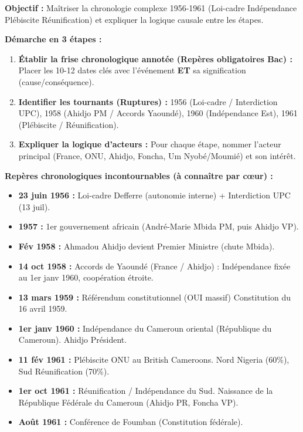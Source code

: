 \documentclass[11pt]{article}
\newcommand{\cle}[1]{{\popxbold\color{popdark}#1}}
\begin{document}
\begin{methode}
\textbf{Objectif :} Maîtriser la chronologie complexe 1956-1961 (Loi-cadre \rightarrow Indépendance \rightarrow Plébiscite \rightarrow Réunification) et expliquer la logique causale entre les étapes.\par
\textbf{Démarche en 3 étapes :}
\begin{enumerate}
    \item \textbf{Établir la frise chronologique annotée (Repères obligatoires Bac) :} Placer les 10-12 dates clés avec l'événement \textbf{ET} sa signification (cause/conséquence).
    \item \textbf{Identifier les tournants (Ruptures) :} 1956 (Loi-cadre / Interdiction UPC), 1958 (Ahidjo PM / Accords Yaoundé), 1960 (Indépendance Est), 1961 (Plébiscite / Réunification).
    \item \textbf{Expliquer la logique d'acteurs :} Pour chaque étape, nommer l'acteur principal (France, ONU, Ahidjo, Foncha, Um Nyobé/Moumié) et son intérêt.
\end{enumerate}
\textbf{Repères chronologiques incontournables (à connaître par cœur) :}
\begin{itemize}
    \item \textbf{23 juin 1956 :} Loi-cadre Defferre (autonomie interne) + Interdiction UPC (13 juil).
    \item \textbf{1957 :} 1er gouvernement africain (André-Marie Mbida PM, puis Ahidjo VP).
    \item \textbf{Fév 1958 :} Ahmadou Ahidjo devient Premier Ministre (chute Mbida).
    \item \textbf{14 oct 1958 :} \cle{Accords de Yaoundé} (France / Ahidjo) : Indépendance fixée au 1er janv 1960, coopération étroite.
    \item \textbf{13 mars 1959 :} \cle{Référendum constitutionnel} (OUI massif) \rightarrow Constitution du 16 avril 1959.
    \item \textbf{1er janv 1960 :} \cle{Indépendance du Cameroun oriental} (République du Cameroun). Ahidjo Président.
    \item \textbf{11 fév 1961 :} \cle{Plébiscite ONU} au British Cameroons. Nord \rightarrow Nigeria (60\%), Sud \rightarrow Réunification (70\%).
    \item \textbf{1er oct 1961 :} \cle{Réunification} / Indépendance du Sud. Naissance de la \cle{République Fédérale du Cameroun} (Ahidjo PR, Foncha VP).
    \item \textbf{Août 1961 :} Conférence de \cle{Foumban} (Constitution fédérale).
\end{itemize}
\end{methode}
\end{document}
